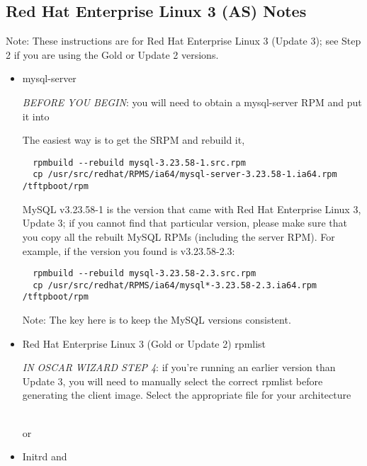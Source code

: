\subsection{Red Hat Enterprise Linux 3 (AS) Notes}
\label{subsec:ia64notes}

Note: These instructions are for Red Hat Enterprise Linux 3 (Update 3); see
Step 2 if you are using the Gold or Update 2 versions.

\begin{itemize}

\item mysql-server

\emph{BEFORE YOU BEGIN}: you will need to obtain a mysql-server RPM and put it into


The easiest way is to get the SRPM and rebuild it,

\begin{verbatim}
  rpmbuild --rebuild mysql-3.23.58-1.src.rpm
  cp /usr/src/redhat/RPMS/ia64/mysql-server-3.23.58-1.ia64.rpm /tftpboot/rpm
\end{verbatim}

MySQL v3.23.58-1 is the version that came with Red Hat Enterprise Linux 3, Update 3; if you cannot
find that particular version, please make sure that you copy all the
rebuilt MySQL RPMs (including the server RPM).  For example, if the
version you found is v3.23.58-2.3:

\begin{verbatim}
  rpmbuild --rebuild mysql-3.23.58-2.3.src.rpm
  cp /usr/src/redhat/RPMS/ia64/mysql*-3.23.58-2.3.ia64.rpm /tftpboot/rpm
\end{verbatim}

Note: The key here is to keep the MySQL versions consistent.


\item Red Hat Enterprise Linux 3 (Gold or Update 2) rpmlist

\emph{IN OSCAR WIZARD STEP 4}: if you're running an earlier version than Update 3, you will
need to manually select the correct rpmlist before generating the client image.
Select the appropriate file for your architecture

  \ \\  %
or
  \ \\  %


\item Initrd and 


\end{itemize}
